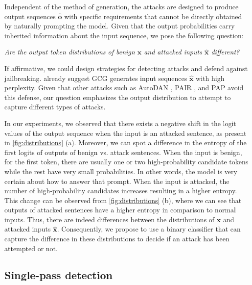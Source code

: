 Independent of the method of generation, the attacks are designed to produce output sequences $\hat{\bm{o}}$ with specific requirements that cannot be directly obtained by naturally prompting the model. Given that the output probabilities carry inherited information about the input sequence, we pose the following question:
\begin{center}
    \emph{{Are the output token distributions of benign $\bm{x}$ and attacked inputs $\hat{\bm{x}}$ different?}}
\end{center}
If affirmative, we could design strategies for detecting attacks and defend against jailbreaking. \citet{jain2023baseline} already suggest GCG generates input sequences $\hat{\bm{x}}$ with high perplexity. Given that other attacks such as AutoDAN \citep{liu2023autodan}, PAIR \citep{chao2023jailbreaking}, and PAP \citep{zeng2024johnny} avoid this defense, our question emphasizes the output distribution to attempt to capture different types of attacks.

In our experiments, we observed that there exists a negative shift in the logit values of the output sequence when the input is an attacked sentence, as present in \cref{fig:distributions} (a). Moreover, we can spot a difference in the entropy of the first logits of outputs of benign vs. attack sentences. When the input is benign, for the first token, there are usually one or two high-probability candidate tokens while the rest have very small probabilities. In other words, the model is very certain about how to answer that prompt. When the input is attacked, the number of high-probability candidates increases resulting in a higher entropy. This change can be observed from \cref{fig:distributions} (b), where we can see that outputs of attacked sentences have a higher entropy in comparison to normal inputs. 
Thus, there are indeed differences between the distributions of  $\bm{x}$ and attacked inputs $\hat{\bm{x}}$. Consequently, we propose to use a binary classifier that can capture the difference in these distributions to decide if an attack has been attempted or not. 

\subsection{Single-pass detection}
\label{subsec:algorithm}

